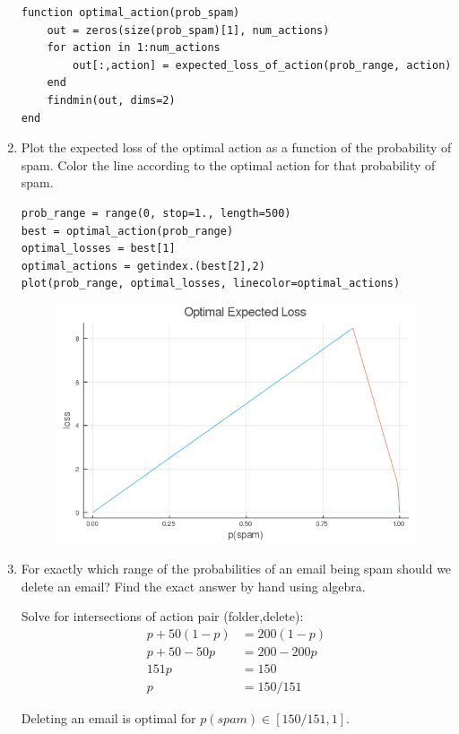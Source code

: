 \documentclass[12pt,letter]{article}
\begin{document}
\begin{enumerate}
\begin{verbatim}
function optimal_action(prob_spam)
    out = zeros(size(prob_spam)[1], num_actions)
    for action in 1:num_actions
        out[:,action] = expected_loss_of_action(prob_range, action)
    end
    findmin(out, dims=2)
end
\end{verbatim}

  \pagebreak
  
\item Plot the expected loss of the optimal action as a function of the probability of spam.
  Color the line according to the optimal action for that probability of spam.

\begin{verbatim}
prob_range = range(0, stop=1., length=500)
best = optimal_action(prob_range)
optimal_losses = best[1]
optimal_actions = getindex.(best[2],2)
plot(prob_range, optimal_losses, linecolor=optimal_actions)
\end{verbatim}

\begin{figure}[h]
  \centering
  \includegraphics[width=14cm,keepaspectratio]{imgs/1_3.png}
\end{figure}
  
\item For exactly which range of the probabilities of an email being spam should we delete an email? Find the exact answer by hand using algebra.
  
  Solve for intersections of action pair (folder,delete):\\
  \begin{align*}
    p +50(1-p) &= 200(1-p)\\
    p + 50 -50p &= 200 - 200p\\
    151p &= 150\\
    p &= 150/151
  \end{align*}

  Deleting an email is optimal for $p(spam) \in [150/151,1]$.
\end{enumerate}
\end{document}
